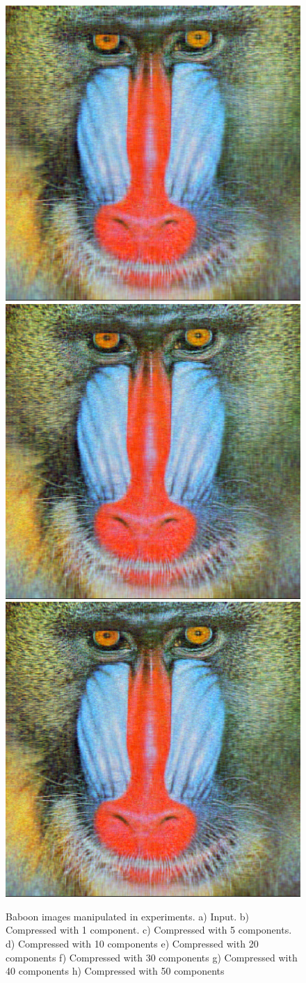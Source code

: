 \documentclass[]{IEEEtran}
\begin{document}
\begin{figure}[h]
  \includegraphics[width=0.4\hsize]{../output/baboon_30.png}
  \includegraphics[width=0.4\hsize]{../output/baboon_40.png}
  \includegraphics[width=0.4\hsize]{../output/baboon_50.png}
  \caption{Baboon images manipulated in experiments. a) Input. b) Compressed with 1 component. c) Compressed with 5 components. d) Compressed with 10 components e) Compressed with 20 components f) Compressed with 30 components g) Compressed with 40 components h) Compressed with 50 components}
  \label{fig:effect-baboon}
\end{figure}
\end{document}
